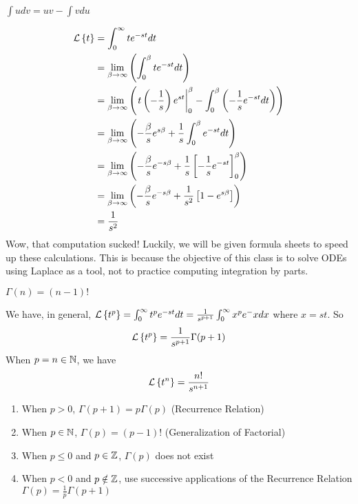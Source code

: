 \begin{example}
    \begin{recall}
        $\int udv = uv - \int vdu$
    \end{recall}

    \begin{align*}
        \operatorname{\mathcal{L}}\left\{t\right\} &= \int_0^\infty t e^{-st} dt \\
        &= \lim_{\beta \to \infty} \left( \int_{0}^{\beta} te^{-st} dt \right) \\
        &= \lim_{\beta \to \infty} \left( \left.t\left(-\frac{1}{s}\right) e^{st}\right|_0^\beta - \int_0^\beta \left(-\frac{1}{s} e^{-st} dt\right) \right) \\
        &= \lim_{\beta \to \infty} \left( -\frac{\beta}{s}e^{s\beta} + \frac{1}{s} \int_0^\beta e^{-st} dt \right) \\
        &= \lim_{\beta \to \infty} \left( -\frac{\beta}{s} e^{-s\beta} + \frac{1}{s} \left[-\frac{1}{s} e^{-st}\right]_0^\beta \right) \\
        &= \lim_{\beta \to \infty} \left( -\frac{\beta}{s} e^{-s\beta} + \frac{1}{s^2}\left[1 - e^{s\beta}\right] \right) \\
        &= \frac{1}{s^2}
    \end{align*}
    Wow, that computation sucked! Luckily, we will be given formula sheets to speed up these calculations. This is because the objective of this class is to solve ODEs using Laplace as a tool, not to practice computing integration by parts.
\end{example}

\begin{recall}
    $\Gamma (n) = (n-1)!$
\end{recall}

\begin{theorem}
    We have, in general, $\operatorname{\mathcal{L}}\left\{t^p\right\} = \int_0^\infty t^p e^{-st} dt = \frac{1}{s^{p+1}} \int_0^\infty x^p e^-x dx$ where $x = st$. 
    So $$\operatorname{\mathcal{L}}\left\{t^p\right\} = \frac{1}{s^{p+1}} \Gamma (p+1)$$ 
    When $p = n \in \mathbb{N}$, we have $$\operatorname{\mathcal{L}}\left\{t^n\right\} = \frac{n!}{s^{n+1}}$$
\end{theorem}

\begin{theorem}
    \spacebeforelist
    \begin{enumerate}
        \item When $p > 0$, $\Gamma (p+1) = p\Gamma(p)$ (Recurrence Relation)
        \item When $p \in \mathbb{N}$, $\Gamma(p) = (p-1)!$ (Generalization of Factorial)
        \item When $p \leq 0$ and $p \in \mathbb{Z}$, $\Gamma(p)$ does not exist
        \item When $p < 0$ and $p \notin \mathbb{Z}$, use successive applications of the Recurrence Relation $\Gamma(p) = \frac{1}{p} \Gamma (p + 1)$
    \end{enumerate}
\end{theorem}

